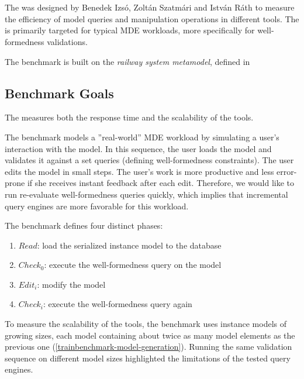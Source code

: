 \section{\tb{}}
\label{trainbenchmark}

The \tb{} was designed by Benedek Izsó, Zoltán Szatmári and István Ráth \cite{high-performance-queries} to measure the efficiency of model queries and manipulation operations in different tools. The \tb{} is primarily targeted for typical MDE workloads, more specifically for well-formedness validations.

The benchmark is built on the \emph{railway system metamodel}, defined in 

\subsection{Benchmark Goals}

The \tb{} measures both the response time and the scalability of the tools.

The benchmark models a ''real-world'' MDE workload by simulating a user's interaction with the model. In this sequence, the user loads the model and validates it against a set  queries (defining well-formedness constraints). The user edits the model in small steps. The user's work is more productive and less error-prone if she receives instant feedback after each edit. Therefore, we would like to run re-evaluate well-formedness queries quickly, which implies that incremental query engines are more favorable for this workload.

The benchmark defines four distinct phases:

\begin{enumerate}
  \item $\mathit{Read}$: load the serialized instance model to the database
  \item $\mathit{Check}_0$: execute the well-formedness query on the model
  \item $\mathit{Edit}_i$: modify the model
  \item $\mathit{Check}_i$: execute the well-formedness query again
\end{enumerate}

To measure the scalability of the tools, the benchmark uses instance models of growing sizes, each model containing about twice as many model elements as the previous one (\autoref{trainbenchmark-model-generation}). Running the same validation sequence on different model sizes highlighted the limitations of the tested query engines.

